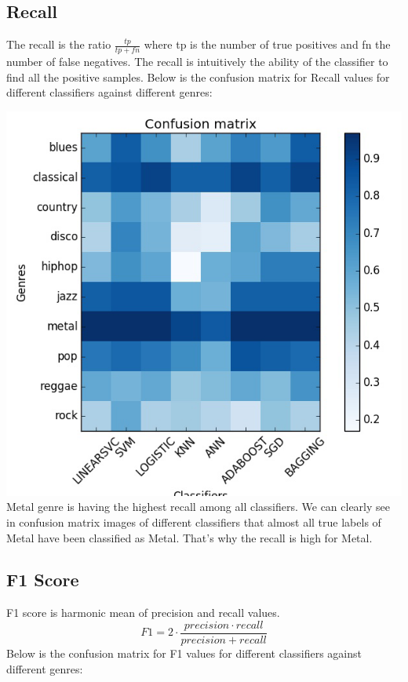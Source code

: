 \documentclass[conference]{IEEEtran}
\begin{document}
\subsection{Recall}
The recall is the ratio $\frac{tp}{tp + fn}$ where tp is the number of true positives and fn the number of false negatives. The recall is intuitively the ability of the classifier to find all the positive samples.
Below is the confusion matrix for Recall values for different classifiers against different genres:

\includegraphics[width=\columnwidth]{recall}
Metal genre is having the highest recall among all classifiers. We can clearly see in confusion matrix images of different classifiers that almost all true labels of Metal have been classified as Metal. That's why the recall is high for Metal.
\subsection{F1 Score}
F1 score is harmonic mean of precision and recall values.
\begin{equation}
    F1=2 \cdot\frac{precision\cdot recall}{precision + recall}
\end{equation}
Below is the confusion matrix for F1 values for different classifiers against different genres:
\end{document}
